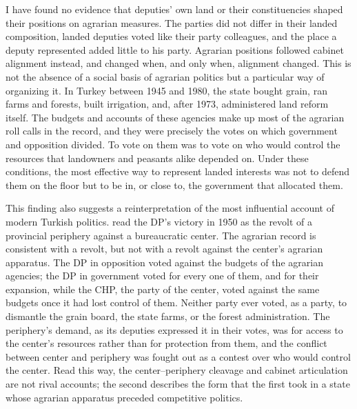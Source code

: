 \documentclass[12pt]{article}
\begin{document}
I have found no evidence that deputies' own land or their constituencies shaped their positions on agrarian measures. The parties did not differ in their landed composition, landed deputies voted like their party colleagues, and the place a deputy represented added little to his party. Agrarian positions followed cabinet alignment instead, and changed when, and only when, alignment changed. This is not the absence of a social basis of agrarian politics but a particular way of organizing it. In Turkey between 1945 and 1980, the state bought grain, ran farms and forests, built irrigation, and, after 1973, administered land reform itself. The budgets and accounts of these agencies make up most of the agrarian roll calls in the record, and they were precisely the votes on which government and opposition divided. To vote on them was to vote on who would control the resources that landowners and peasants alike depended on. Under these conditions, the most effective way to represent landed interests was not to defend them on the floor but to be in, or close to, the government that allocated them.

This finding also suggests a reinterpretation of the most influential account of modern Turkish politics. \citet{mardin1973} read the DP's victory in 1950 as the revolt of a provincial periphery against a bureaucratic center. The agrarian record is consistent with a revolt, but not with a revolt against the center's agrarian apparatus. The DP in opposition voted against the budgets of the agrarian agencies; the DP in government voted for every one of them, and for their expansion, while the CHP, the party of the center, voted against the same budgets once it had lost control of them. Neither party ever voted, as a party, to dismantle the grain board, the state farms, or the forest administration. The periphery's demand, as its deputies expressed it in their votes, was for access to the center's resources rather than for protection from them, and the conflict between center and periphery was fought out as a contest over who would control the center. Read this way, the center--periphery cleavage and cabinet articulation are not rival accounts; the second describes the form that the first took in a state whose agrarian apparatus preceded competitive politics.
\end{document}
